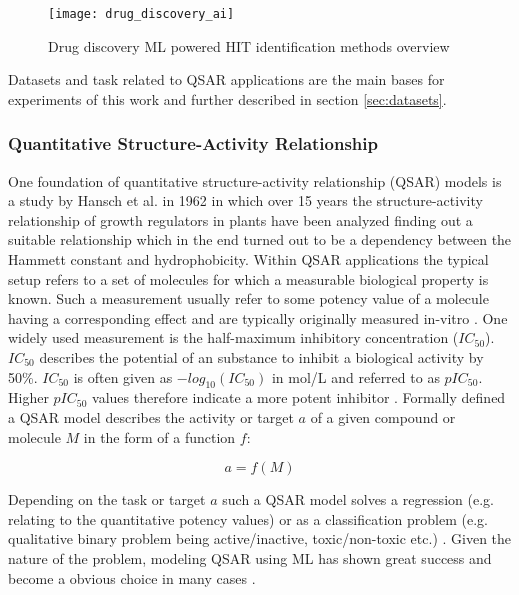 \documentclass[../main.tex]{subfiles}
\begin{document}
\begin{figure}[H]
    \centering
    \texttt{[image: drug\_discovery\_ai]}    
    \caption{Drug discovery ML powered HIT identification methods overview \cite{kim_artificial_2020}}
    \label{fig:drug_discovery_ai}
\end{figure}

Datasets and task related to QSAR applications are the main bases for experiments of this work and further described in section \ref{sec:datasets}.

\subsubsection{Quantitative Structure-Activity Relationship}

One foundation of quantitative structure-activity relationship (QSAR) models is a study by Hansch et al.\cite{hansch_correlation_1962} in 1962 in which over 15 years the structure-activity relationship of growth regulators in plants have been analyzed finding out a suitable relationship which in the end turned out to be a dependency between the Hammett constant and hydrophobicity.  
Within QSAR applications the typical setup refers to a set of molecules for which a measurable biological property is known. Such a measurement usually refer to some potency value of a molecule having a corresponding effect and are typically originally measured in-vitro \cite{cherkasov_qsar_2014}. 
One widely used measurement is the half-maximum inhibitory concentration ($IC_{50}$). $IC_{50}$ describes the potential of an substance to inhibit a biological activity by 50\%. $IC_{50}$ is often given as $-log_{10}(IC_{50})$ in mol/L and referred to as $pIC_{50}$. Higher $pIC_{50}$ values therefore indicate a more potent inhibitor \cite{noauthor_ic50_2021}.
Formally defined a QSAR model describes the activity or target $a$ of a given compound or molecule $M$ in the form of a function $f$:

\begin{equation}
    a = f(M)
\end{equation}

Depending on the task or target $a$ such a QSAR model solves a regression (e.g. relating to the quantitative potency values) or as a classification problem (e.g. qualitative binary problem being active/inactive, toxic/non-toxic etc.) \cite{cherkasov_qsar_2014}. Given the nature of the problem, modeling QSAR using ML has shown great success and become a obvious choice in many cases \cite{ma_deep_2015}.
\end{document}
